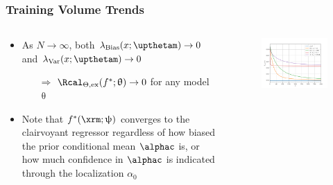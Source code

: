 \documentclass[aspectratio=169]{beamer}
\begin{document}
\begin{frame}
\frametitle{Training Volume Trends}

\begin{columns}[c]

\begin{column}{.5\linewidth}

\begin{itemize}
\item As $N \to \infty$, both $\lambda_{\text{Bias}}(x; \upthetam) \to 0$ and $\lambda_{\text{Var}}(x; \upthetam) \to 0$
\begin{itemize}
\item[$\Rightarrow$] $\Rcal_{\Theta, \mathrm{ex}}(f^* ; \uptheta) \to 0$ for \alert{any} model $\uptheta$ 
\end{itemize} 
\vspace{.5em}
\item Note that $f^*(\xrm;\uppsi)$ converges to the clairvoyant regressor \alert{regardless} of how biased the prior conditional mean $\alphac$ is, or how much confidence in $\alphac$ is indicated through the localization $\alpha_0$
\end{itemize}


\end{column}

\begin{column}{.5\linewidth}

\begin{figure}
	\centering
	\includegraphics[width=1\linewidth]{Discrete/SE/risk_N_leg_a0.png}
	\label{fig:Discrete/SE/risk_N_leg_a0}
\end{figure}

\end{column}

\end{columns}

\end{frame}
\end{document}
